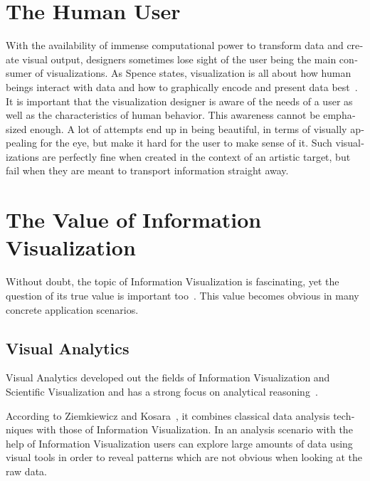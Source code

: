\begin{english}
\section{The Human User}

With the availability of immense computational power to transform data and create visual output, designers sometimes lose sight of the user being the main consumer of visualizations. As Spence states, visualization is all about how human beings interact with data and how to graphically encode and present data best~\cite{InformationVisualization07}. It is important that the visualization designer is aware of the needs of a user as well as the characteristics of human behavior. This awareness cannot be emphasized enough. A lot of attempts end up in being beautiful, in terms of visually appealing for the eye, but make it hard for the user to make sense of it. Such visualizations are perfectly fine when created in the context of an artistic target, but fail when they are meant to transport information straight away.


\section{The Value of Information Visualization}

Without doubt, the topic of Information Visualization is fascinating, yet the question of its true value is important too~\cite{InformationVisualization07}. This value becomes obvious in many concrete application scenarios.


\subsection{Visual Analytics}

Visual Analytics developed out the fields of Information Visualization and Scientific Visualization and has a strong focus on analytical reasoning~\cite{Keim2008}.

According to Ziemkiewicz and Kosara~\cite{Ziemkiewicz10}, it combines classical data analysis techniques with those of Information Visualization. In an analysis scenario with the help of Information Visualization users can explore large amounts of data using visual tools in order to reveal patterns which are not obvious when looking at the raw data.


\end{english}
